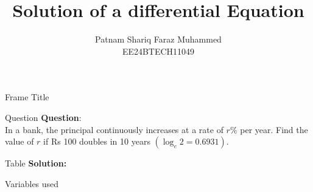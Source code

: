 \documentclass{beamer}
\title{Solution of a differential Equation}
\author{Patnam Shariq Faraz Muhammed \\ EE24BTECH11049}
\date{}
\providecommand{\brak}[1]{\ensuremath{\left(#1\right)}}
\theoremstyle{remark}
\numberwithin{equation}{section}
\begin{document}
\begin{frame}{Frame Title}
    \titlepage
\end{frame}

\begin{frame}{Question}
    \textbf{Question}:\\
    In a bank, the principal continuously increases at a rate of $r\%$ per year. Find the value of $r$ if Rs 100 doubles in 10 years \brak{\log_e2 = 0.6931}.
\end{frame}

\begin{frame}{Table}
    \textbf{Solution: }\\
    \begin{table}[ht!]
        \centering
        
        \caption{Variables used}
        \label{tab:my_label}
    \end{table}
\end{frame}
\end{document}
